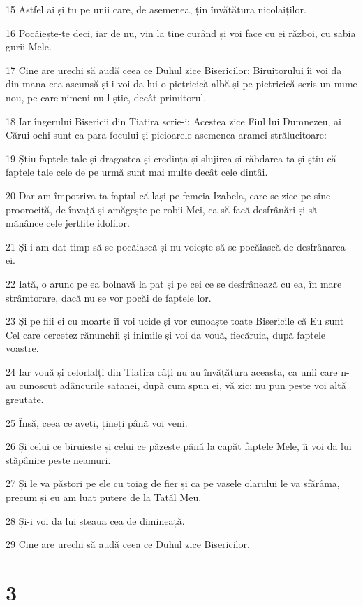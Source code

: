 \par 15 Astfel ai și tu pe unii care, de asemenea, țin învățătura nicolaiților.
\par 16 Pocăiește-te deci, iar de nu, vin la tine curând și voi face cu ei război, cu sabia gurii Mele.
\par 17 Cine are urechi să audă ceea ce Duhul zice Bisericilor: Biruitorului îi voi da din mana cea ascunsă și-i voi da lui o pietricică albă și pe pietricică scris un nume nou, pe care nimeni nu-l știe, decât primitorul.
\par 18 Iar îngerului Bisericii din Tiatira scrie-i: Acestea zice Fiul lui Dumnezeu, ai Cărui ochi sunt ca para focului și picioarele asemenea aramei strălucitoare:
\par 19 Știu faptele tale și dragostea și credința și slujirea și răbdarea ta și știu că faptele tale cele de pe urmă sunt mai multe decât cele dintâi.
\par 20 Dar am împotriva ta faptul că lași pe femeia Izabela, care se zice pe sine proorociță, de învață și amăgește pe robii Mei, ca să facă desfrânări și să mănânce cele jertfite idolilor.
\par 21 Și i-am dat timp să se pocăiască și nu voiește să se pocăiască de desfrânarea ei.
\par 22 Iată, o arunc pe ea bolnavă la pat și pe cei ce se desfrânează cu ea, în mare strâmtorare, dacă nu se vor pocăi de faptele lor.
\par 23 Și pe fiii ei cu moarte îi voi ucide și vor cunoaște toate Bisericile că Eu sunt Cel care cercetez rănunchii și inimile și voi da vouă, fiecăruia, după faptele voastre.
\par 24 Iar vouă și celorlalți din Tiatira câți nu au învățătura aceasta, ca unii care n-au cunoscut adâncurile satanei, după cum spun ei, vă zic: nu pun peste voi altă greutate.
\par 25 Însă, ceea ce aveți, țineți până voi veni.
\par 26 Și celui ce biruiește și celui ce păzește până la capăt faptele Mele, îi voi da lui stăpânire peste neamuri.
\par 27 Și le va păstori pe ele cu toiag de fier și ca pe vasele olarului le va sfărâma, precum și eu am luat putere de la Tatăl Meu.
\par 28 Și-i voi da lui steaua cea de dimineață.
\par 29 Cine are urechi să audă ceea ce Duhul zice Bisericilor.

\chapter{3}

